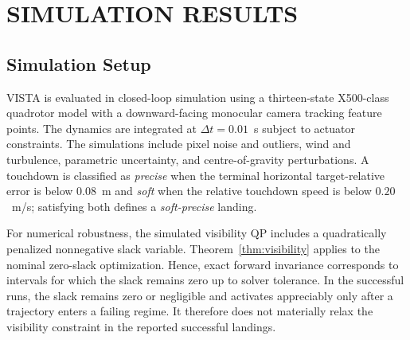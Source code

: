 \documentclass[10pt,conference]{IEEEtran}
\begin{document}
\section{SIMULATION RESULTS}
\label{sec:experiments}

\subsection{Simulation Setup}

VISTA is evaluated in closed-loop simulation using a thirteen-state
X500-class quadrotor model with a downward-facing monocular camera
tracking feature points. The dynamics are integrated at
$\Delta t=0.01$~s subject to actuator constraints. The simulations
include pixel noise and outliers, wind and turbulence, parametric
uncertainty, and centre-of-gravity perturbations. A touchdown is
classified as \emph{precise} when the terminal horizontal
target-relative error is below $0.08$~m and \emph{soft} when the
relative touchdown speed is below $0.20$~m/s; satisfying both defines
a \emph{soft-precise} landing.

For numerical robustness, the simulated visibility QP includes a quadratically penalized nonnegative slack variable. Theorem~\ref{thm:visibility} applies to the nominal zero-slack optimization. Hence, exact forward invariance corresponds to intervals for which the slack remains zero up to solver tolerance. In the successful runs, the slack remains zero or negligible and activates appreciably only after a trajectory enters a failing regime. It therefore does not materially relax the visibility constraint in the reported successful landings.
\end{document}
